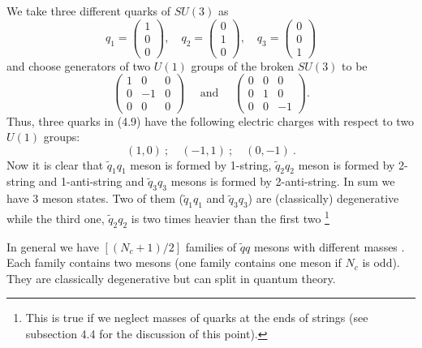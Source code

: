 \documentclass[a4paper,12pt]{article}
\begin{document}
We take three different quarks of $SU(3)$ as
\begin{equation}
q_1=\left(\begin{array}{l}1\\0\\0\end{array}\right),  \quad
q_2=\left(\begin{array}{l}0\\1\\0\end{array}\right), \quad
q_3=\left(\begin{array}{l}0\\0\\1\end{array}\right)
\end{equation}
and choose generators of two $U(1)$ groups of the broken
$SU(3)$ to be
\begin{equation}
\left(\begin{array}{ccc}1&0&0\\ 0&-1 &0\\ 0&0&0
\end{array}\right)
\quad \mbox{ and }\quad
\left(\begin{array}{ccc}0&0&0\\ 0&1 &0\\ 0&0&-1
\end{array}\right) .
\end{equation}
Thus, three quarks in (4.9) have the following electric charges
with respect to two $U(1)$ groups:
\begin{equation}
(1,0)\ ; \quad (-1,1)\ ; \quad (0, -1)\ .
\end{equation}
Now it is clear that $\tilde q_1q_1$ meson is formed by 1-string,
$\tilde q_2q_2$ meson is formed by 2-string and 1-anti-string and
$\tilde q_3q_3$ mesons is formed by 2-anti-string. In sum we have 3
meson states. Two of them ($\tilde q_1q_1$ and $\tilde q_3q_3$) are
(classically) degenerative while the third one, $\tilde q_2q_2$ is
two times heavier than the first two \footnote{This is true if
we neglect masses of quarks at the ends of strings (see
subsection 4.4 for the discussion of this point).}

In general we have $[(N_c+1)/2]$ families of $\tilde qq$ mesons
with different masses \cite{DS,HSZ}. Each family contains 
two mesons (one family contains one meson if $N_c$ is odd).
 They are classically degenerative but can split in
quantum theory.
\end{document}
